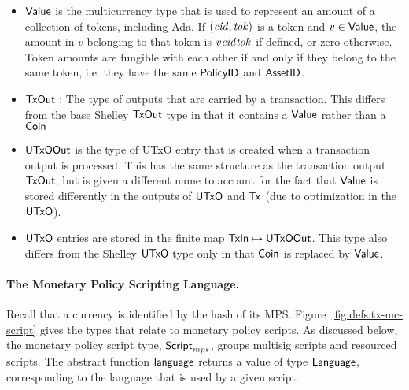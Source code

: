 \begin{itemize}
  \item $\mathsf{Value}$ is the multicurrency type that is used to represent
    an amount of a collection of tokens, including Ada. If $(\mathit{cid}, \mathit{tok})$ is a token and $v \in \mathsf{Value}$,
    the amount in $v$ belonging to that token is $v \mathit{cid} \mathit{tok}$ if defined, or zero otherwise.
    Token amounts are fungible with each other if and only if they belong to the same token,
    i.e. they have the same $\mathsf{PolicyID}$ and $\mathsf{AssetID}$.



\item $\mathsf{TxOut}$ : The type of outputs that are carried by a transaction. This differs from the base Shelley
  $\mathsf{TxOut}$ type in that it contains a $\mathsf{Value}$ rather than a $\mathsf{Coin}$

  \item $\mathsf{UTxOOut}$ is the type of UTxO entry that is created when a transaction
  output is processed. This has the same structure as
  the transaction output $\mathsf{TxOut}$, but is given a different name to
  account for the fact that $\mathsf{Value}$ is stored differently in the outputs of $\mathsf{UTxO}$ and $\mathsf{Tx}$
  (due to optimization in the $\mathsf{UTxO}$).

  \item $\mathsf{UTxO}$ entries are stored in the finite map $\mathsf{TxIn}\mapsto \mathsf{UTxOOut}$.
  This type also differs from the Shelley $\mathsf{UTxO}$ type only in that $\mathsf{Coin}$ is replaced by $\mathsf{Value}$.

\end{itemize}

\paragraph*{The Monetary Policy Scripting Language.}
Recall that a currency is identified by the hash of its MPS.
Figure~\ref{fig:defs:tx-mc-script} gives the types that relate to monetary
policy scripts. %
As discussed below, the monetary policy script type, $\mathsf{Script}_{mps}$, groups multisig scripts
and resourced scripts.
The abstract
function $\mathsf{language}$ returns a value of type $\mathsf{Language}$,
corresponding to the language that is used by a given script.

